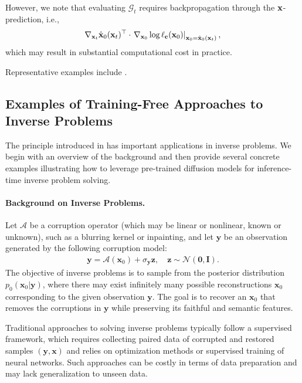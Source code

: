 However, we note that evaluating $\mathcal{G}_t$ requires backpropagation through the ${\mathbf{x}}$-prediction, i.e.,
\[
\nabla_{{\mathbf{x}}_t} \hat{{\mathbf{x}}}_0({\mathbf{x}}_t)^\top \cdot 
\left.\nabla_{{\mathbf{x}}_0} \log \ell_{{\mathbf{c}}}({\mathbf{x}}_0)\right|_{{\mathbf{x}}_0 = \hat{{\mathbf{x}}}_0({\mathbf{x}}_t)},
\]
which may result in substantial computational cost in practice.

Representative examples include \citep{yu2023freedom, chung2022diffusion, bansal2023universal}.




\subsection{Examples of Training-Free Approaches to Inverse Problems}\label{subsec:inverse-problem}
The principle introduced in  has important applications in inverse problems. We begin with an overview of the background and then provide several concrete examples illustrating how to leverage pre-trained diffusion models for inference-time inverse problem solving.

\paragraph{Background on Inverse Problems.}
Let $\mathcal{A}$ be a corruption operator (which may be linear or nonlinear, known or unknown), such as a blurring kernel or inpainting, and let $\mathbf{y}$ be an observation generated by the following corruption model:
\begin{align}\label{eq:inverse_problem}
    \mathbf{y} = \mathcal{A}(\mathbf{x}_0) + \sigma_{\mathbf{y}} \mathbf{z}, \quad \mathbf{z} \sim \mathcal{N}(\mathbf{0}, \mathbf{I}).
\end{align}
The objective of inverse problems is to sample from the posterior distribution $p_0(\mathbf{x}_0 | \mathbf{y})$, where there may exist infinitely many possible reconstructions $\mathbf{x}_0$ corresponding to the given observation $\mathbf{y}$. The goal is to recover an $\mathbf{x}_0$ that removes the corruptions in $\mathbf{y}$ while preserving its faithful and semantic features.


Traditional approaches to solving inverse problems typically follow a supervised framework, which requires collecting paired data of corrupted and restored samples $(\mathbf{y}, \mathbf{x})$ and relies on optimization methods or supervised training of neural networks. Such approaches can be costly in terms of data preparation and may lack generalization to unseen data.


